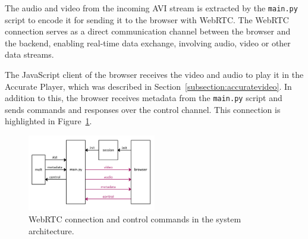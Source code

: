 \documentclass[../MasterThesis.tex]{subfiles}
\begin{document}
The audio and video from the incoming AVI stream is extracted by the \texttt{main.py} script to encode it for sending it to the browser with WebRTC. The WebRTC connection serves as a direct communication channel between the browser and the backend, enabling real-time data exchange, involving audio, video or other data streams. 


%


The JavaScript client of the browser receives the video and audio to play it in the Accurate Player, which was described in Section~\ref{subsection:accuratevideo}. In addition to this, the browser
receives metadata from the \texttt{main.py} script and sends commands and responses over the control channel. This connection is highlighted in Figure~\ref{figure:videoaudio}.


\begin{figure}[H]
	\centering
	\includegraphics[width=0.5\textwidth]{IM_wrtc_control.png}
	\caption[WebRTC and control in the system architecture.]{WebRTC connection and control commands in the system architecture.}
	\label{figure:videoaudio}
\end{figure}
\end{document}
